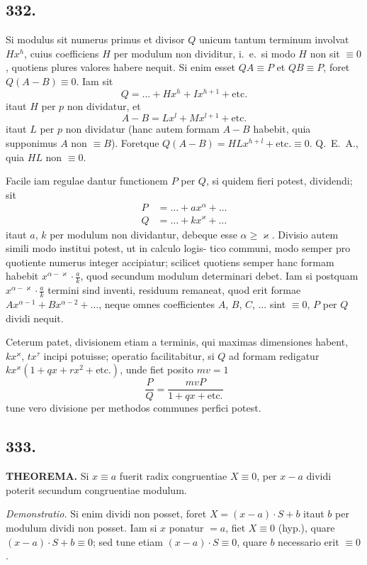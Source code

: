 \documentclass[12pt,a4paper]{article}
\begin{document}
\subsection*{332.}

Si modulus sit numerus primus et divisor $Q$ unicum tantum terminum involvat $Hx^h$, cuius coefficiens $H$ per modulum non dividitur, i.~e.~si modo $H$ non sit $\equiv 0$, quotiens plures valores habere nequit. Si enim esset $QA\equiv P$ et $QB\equiv P$, foret $Q(A-B)\equiv 0$. Iam sit
\[
Q = \ldots + Hx^h + Ix^{h+1} + \text{etc.}
\]
itaut $H$ per $p$ non dividatur, et
\[
A-B = Lx^l + Mx^{l+1} + \text{etc.}
\]
itaut $L$ per $p$ non dividatur (hanc autem formam $A-B$ habebit, quia supponimus $A$ non $\equiv B$). Foretque $Q(A-B) = HLx^{h+l} + \text{etc.} \equiv 0$. Q.~E.~A., quia $HL$ non $\equiv 0$.

Facile iam regulae dantur functionem $P$ per $Q$, si quidem fieri potest, dividendi; sit
\[
\begin{aligned}
P &= \ldots + ax^\alpha + \ldots\\
Q &= \ldots + kx^\varkappa + \ldots
\end{aligned}
\]
itaut $a$, $k$ per modulum non dividantur, debeque esse $\alpha\geq\varkappa$. Divisio autem simili modo institui potest, ut in calculo logis- tico communi, modo semper pro quotiente numerus integer accipiatur; scilicet quotiens semper hanc formam habebit $x^{\alpha-\varkappa}\cdot\frac{a}{k}$, quod secundum modulum determinari debet. Iam si postquam $x^{\alpha-\varkappa}\cdot\frac{a}{k}$ termini sind inventi, residuum remaneat, quod erit formae $Ax^{\alpha-1}+Bx^{\alpha-2}+\ldots$, neque omnes coefficientes $A$, $B$, $C$, $\ldots$ sint $\equiv 0$, $P$ per $Q$ dividi nequit.

Ceterum patet, divisionem etiam a terminis, qui maximas dimensiones habent, $kx^\varkappa$, $tx^\tau$ incipi potuisse; operatio facilitabitur, si $Q$ ad formam redigatur $kx^\varkappa(1+qx+rx^2+\text{etc.})$, unde fiet posito $mv=1$
\[
\frac{P}{Q} = \frac{mvP}{1+qx+\text{etc.}}
\]
tune vero divisione per methodos communes perfici potest.

\subsection*{333.}

\textbf{THEOREMA.} Si $x\equiv a$ fuerit radix congruentiae $X\equiv 0$, per $x-a$ dividi poterit secundum congruentiae modulum.

\textit{Demonstratio.} Si enim dividi non posset, foret $X=(x-a)\cdot S+b$ itaut $b$ per modulum dividi non posset. Iam si $x$ ponatur $=a$, fiet $X\equiv 0$ (hyp.), quare $(x-a)\cdot S+b\equiv 0$; sed tune etiam $(x-a)\cdot S\equiv 0$, quare $b$ necessario erit $\equiv 0$.
\end{document}
